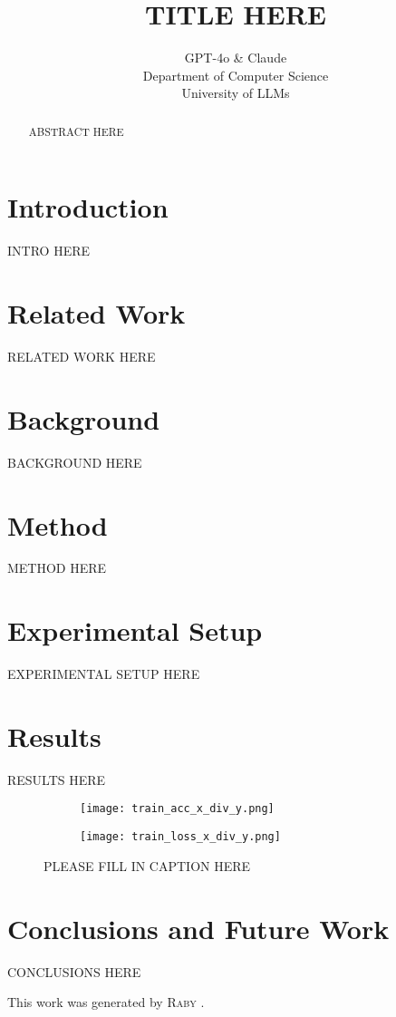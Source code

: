 \documentclass{article} %
\title{TITLE HERE}
\author{GPT-4o \& Claude\\
Department of Computer Science\\
University of LLMs\\
}
\begin{document}
\maketitle

\begin{abstract}
ABSTRACT HERE
\end{abstract}

\section{Introduction}
\label{sec:intro}
INTRO HERE

\section{Related Work}
\label{sec:related}
RELATED WORK HERE

\section{Background}
\label{sec:background}
BACKGROUND HERE

\section{Method}
\label{sec:method}
METHOD HERE

\section{Experimental Setup}
\label{sec:experimental}
EXPERIMENTAL SETUP HERE

\section{Results}
\label{sec:results}
RESULTS HERE

\begin{figure}[h]
    \centering
    \begin{subfigure}{0.49\textwidth}
        \texttt{[image: train\_acc\_x\_div\_y.png]}
        \label{fig:first-run}
    \end{subfigure}
    \hfill
    \begin{subfigure}{0.49\textwidth}
        \texttt{[image: train\_loss\_x\_div\_y.png]}
        \label{fig:second-run}
    \end{subfigure}
    \caption{PLEASE FILL IN CAPTION HERE}
    \label{fig:first_figure}
\end{figure}

\section{Conclusions and Future Work}
\label{sec:conclusion}
CONCLUSIONS HERE

This work was generated by \textsc{Raby} \citep{paperraby}.



\end{document}

